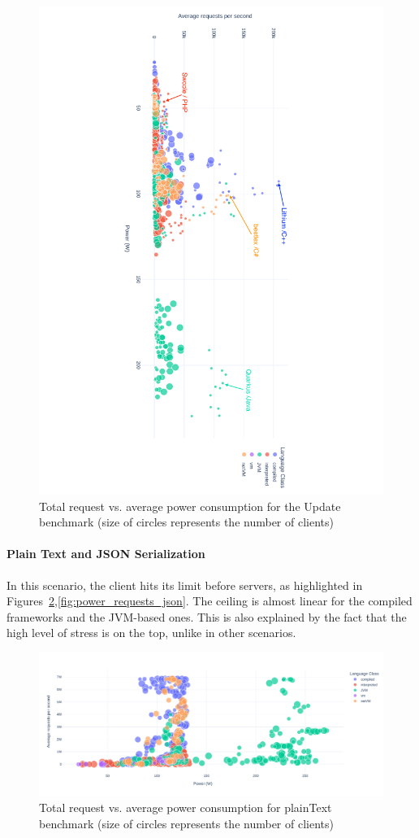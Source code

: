 \begin{figure}[hbt]
    \includegraphics[height=\textwidth,width=\textheight,keepaspectratio,angle=90]{imgs/power_requests_update}
    \caption{Total request vs. average power consumption for the Update benchmark (size of circles represents the number of clients)}
    \label{fig:power_requests_update}
\end{figure}

\paragraph{Plain Text and JSON Serialization}
In this scenario, the client hits its limit before servers, as highlighted in Figures~\ref{fig:power_requests_plaintext},\ref{fig:power_requests_json}.
The ceiling is almost linear for the compiled frameworks and the JVM-based ones.
This is also explained by the fact that the high level of stress is on the top, unlike in other scenarios.

\begin{figure}[hbt]
    \centering
    \includegraphics[width=\textwidth,height=\textheight,keepaspectratio]{imgs/power_requests_plaintext}
    \caption{Total request vs. average power consumption for plainText benchmark (size of circles represents the number of clients)}
    \label{fig:power_requests_plaintext}
\end{figure}

